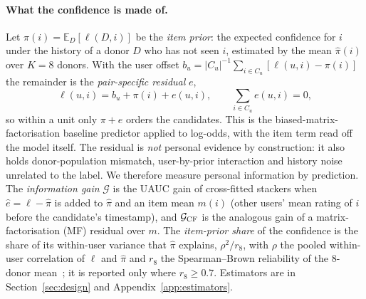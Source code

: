 \paragraph{What the confidence is made of.}
Let $\pi(i)=\mathbb E_D[\ell(D,i)]$ be the \emph{item prior}: the expected confidence for $i$ under the history of a donor $D$ who
has not seen $i$, estimated by the mean $\hat\pi(i)$ over $K=8$ donors. With the user offset
$b_u=|C_u|^{-1}\sum_{i\in C_u}[\ell(u,i)-\pi(i)]$ the remainder is the \emph{pair-specific residual} $e$,
\begin{equation}\label{eq:decomp}
  \ell(u,i)=b_u+\pi(i)+e(u,i),\qquad \textstyle\sum_{i\in C_u}e(u,i)=0,
\end{equation}
so within a unit only $\pi+e$ orders the candidates. This is the biased-matrix-factorisation baseline predictor applied to log-odds,
with the item term read off the model itself. The residual is \emph{not} personal evidence by construction: it also holds
donor-population mismatch, user-by-prior interaction and history noise unrelated to the label. We therefore measure personal
information by prediction. The \emph{information gain} $\mathcal G$ is the UAUC gain of cross-fitted stackers when
$\hat e=\ell-\hat\pi$ is added to $\hat\pi$ and an item mean $m(i)$ (other users' mean rating of $i$ before the candidate's
timestamp), and $\mathcal G_{\rm CF}$ is the analogous gain of a matrix-factorisation (MF) residual over $m$. The \emph{item-prior
share} of the confidence is the share of its within-user variance that $\hat\pi$ explains, $\rho^2/r_8$, with $\rho$ the pooled
within-user correlation of $\ell$ and $\hat\pi$ and $r_8$ the Spearman--Brown reliability of the 8-donor
mean~\citep{spearman1910correlation,brown1910experimental}; it is reported only where $r_8\ge0.7$. Estimators are in
Section~\ref{sec:design} and Appendix~\ref{app:estimators}.

